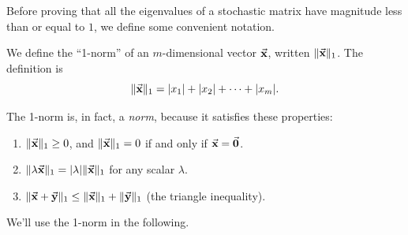 Before proving that all the eigenvalues of a stochastic
matrix have magnitude less than or equal to $1$, we
define some convenient notation.

\begin{definition}
We define the ``1-norm'' of an $m$-dimensional vector
$\vec{\textbf{x}}$, written
$\|\vec{\textbf{x}}\|_1$.  The definition is
\begin{equation}
  \| \vec{\textbf{x}} \|_1 = |x_1| + |x_2| + \cdots + |x_m|.
\end{equation}
\end{definition}
The 1-norm is, in fact, a \emph{norm}, because it
satisfies these properties:
\begin{enumerate}
\item $\|\vec{\textbf{x}}\|_1 \ge 0$, and $\|\vec{\textbf{x}}\|_1 = 0$ if and only
if $\vec{\textbf{x}} = \vec{\textbf{0}}$.
\item $\|\lambda \vec{\textbf{x}}\|_1 = |\lambda|\|\vec{\textbf{x}}\|_1$ for any
scalar $\lambda$.
\item $\|\vec{\textbf{x}}+\vec{\textbf{y}}\|_1 \le \|\vec{\textbf{x}}\|_1 + \|\vec{\textbf{y}}\|_1$
(the triangle inequality).
\end{enumerate}

We'll use the 1-norm in the following.

